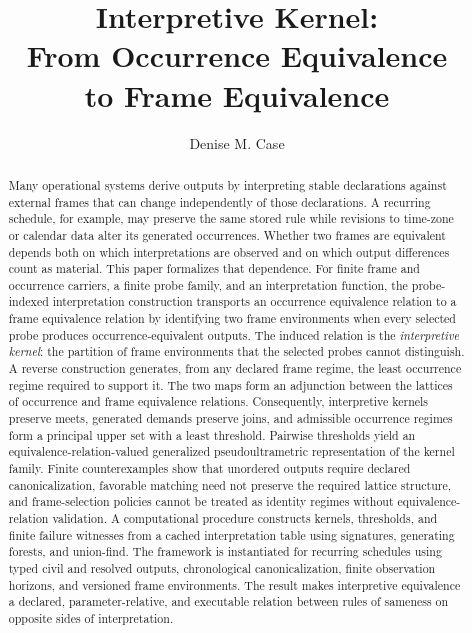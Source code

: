 \documentclass[11pt]{article}
\title{
Interpretive Kernel:\\
From Occurrence Equivalence \\
to Frame Equivalence
}
\author{Denise M. Case}
\affil{\small School of Computer Science and Information Systems\\
Northwest Missouri State University, Maryville, MO, USA}
\date{}
\theoremstyle{plain}
\theoremstyle{definition}
\theoremstyle{remark}
\begin{document}
\maketitle
\vspace{-2em}

\begin{abstract}
  Many operational systems derive outputs
  by interpreting stable declarations against external frames
  that can change independently of those declarations.
  A recurring schedule, for example, may preserve the same stored rule
  while revisions to time-zone or calendar data alter its generated occurrences.
  Whether two frames are equivalent depends both on which interpretations are observed
  and on which output differences count as material.
  This paper formalizes that dependence.
  For finite frame and occurrence carriers, a finite probe family,
  and an interpretation function, the probe-indexed interpretation construction
  transports an occurrence equivalence relation to a frame equivalence relation
  by identifying two frame environments when every selected probe
  produces occurrence-equivalent outputs.
  The induced relation is the \emph{interpretive kernel}:
  the partition of frame environments that the selected probes cannot distinguish.
  A reverse construction generates, from any declared frame regime,
  the least occurrence regime required to support it.
  The two maps form an adjunction between the lattices of occurrence and frame equivalence relations.
  Consequently, interpretive kernels preserve meets, generated demands preserve joins,
  and admissible occurrence regimes form a principal upper set with a least threshold.
  Pairwise thresholds yield an equivalence-relation-valued generalized pseudoultrametric representation of the kernel family.
  Finite counterexamples show that unordered outputs require declared canonicalization,
  favorable matching need not preserve the required lattice structure,
  and frame-selection policies cannot be treated as identity regimes without equivalence-relation validation.
  A computational procedure constructs kernels, thresholds, and finite failure witnesses
  from a cached interpretation table using signatures, generating forests, and union-find.
  The framework is instantiated for recurring schedules using typed civil and resolved outputs,
  chronological canonicalization, finite observation horizons, and versioned frame environments.
  The result makes interpretive equivalence a declared, parameter-relative, and executable relation
  between rules of sameness on opposite sides of interpretation.
\end{abstract}
\end{document}
